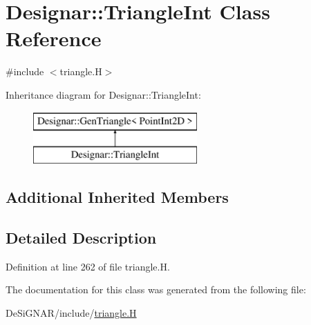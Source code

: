 \hypertarget{class_designar_1_1_triangle_int}{}\section{Designar\+:\+:Triangle\+Int Class Reference}
\label{class_designar_1_1_triangle_int}


{\ttfamily \#include $<$triangle.\+H$>$}

Inheritance diagram for Designar\+:\+:Triangle\+Int\+:\begin{figure}[H]
\begin{center}
\leavevmode
\includegraphics[height=2.000000cm]{class_designar_1_1_triangle_int}
\end{center}
\end{figure}
\subsection*{Additional Inherited Members}


\subsection{Detailed Description}


Definition at line 262 of file triangle.\+H.



The documentation for this class was generated from the following file\+:\begin{DoxyCompactItemize}
\item 
De\+Si\+G\+N\+A\+R/include/\hyperlink{triangle_8_h}{triangle.\+H}\end{DoxyCompactItemize}
